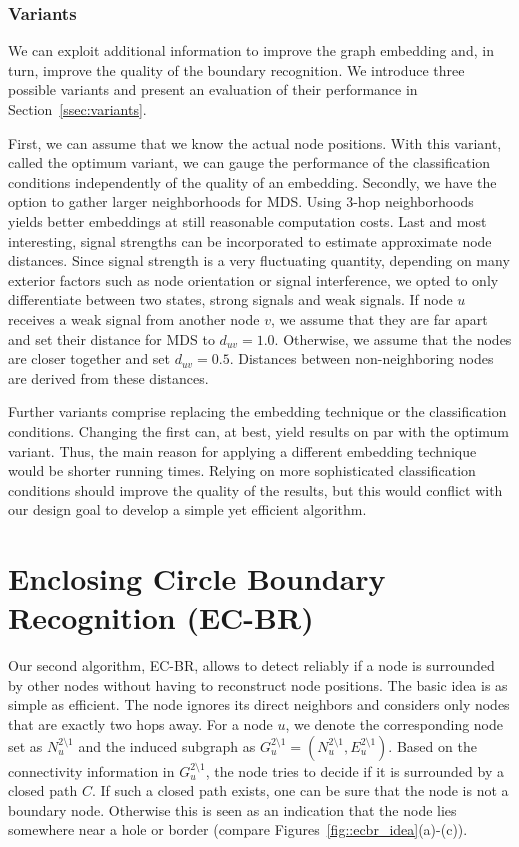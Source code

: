\documentclass{llncs}
\begin{document}
\subsubsection{Variants}\label{ssec:mdsbr_variants}
We can exploit additional information to improve the graph embedding and, in turn, improve the quality of the boundary recognition.
We introduce three possible variants and present an evaluation of their performance in Section~\ref{ssec:variants}.

First, we can assume that we know the actual node positions.
With this variant, called the optimum variant, we can gauge the performance of the classification conditions independently of the quality of an embedding.
Secondly, we have the option to gather larger neighborhoods for MDS.
Using $3$-hop neighborhoods yields better embeddings at still reasonable computation costs.
Last and most interesting, signal strengths can be incorporated to estimate approximate node distances.
Since signal strength is a very fluctuating quantity, depending on many exterior factors such as node orientation or signal interference, we opted to only differentiate between two states, strong signals and weak signals.
If node $u$ receives a weak signal from another node $v$, we assume that they are far apart and set their distance for MDS to $d_{uv} = 1.0$.
Otherwise, we assume that the nodes are closer together and set $d_{uv} = 0.5$.
Distances between non-neighboring nodes are derived from these distances.

Further variants comprise replacing the embedding technique or the classification conditions.
Changing the first can, at best, yield results on par with the optimum variant.
Thus, the main reason for applying a different embedding technique would be shorter running times.
Relying on more sophisticated classification conditions should improve the quality of the results, but this would conflict with our design goal to develop a simple yet efficient algorithm.


\section{Enclosing Circle Boundary Recognition (EC-BR)}\label{sec:ecbr}
Our second algorithm, EC-BR, allows to detect reliably if a node is surrounded by other nodes without having to reconstruct node positions.
The basic idea is as simple as efficient.
The node ignores its direct neighbors and considers only nodes that are exactly two hops away.
For a node $u$, we denote the corresponding node set as $N_u^{2\setminus1}$ and the induced subgraph as $G_u^{2\setminus1} = (N_u^{2\setminus1}, E_u^{2\setminus1})$.
Based on the connectivity information in  $G_u^{2\setminus1}$, the node tries to decide if it is surrounded by a closed path $\mathit{C}$.
If such a closed path exists, one can be sure that the node is not a boundary node.
Otherwise this is seen as an indication that the node lies somewhere near a hole or border (compare Figures~\ref{fig::ecbr_idea}(a)-(c)).
\end{document}
